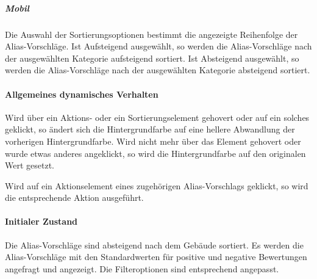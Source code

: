 \subparagraph*{Mobil}
Die Auswahl der Sortierungsoptionen bestimmt die angezeigte Reihenfolge der Alias-Vorschläge.
Ist \dq Aufsteigend \dq{} ausgewählt, so werden die Alias-Vorschläge nach der ausgewählten Kategorie aufsteigend sortiert.
Ist \dq Absteigend \dq{} ausgewählt, so werden die Alias-Vorschläge nach der ausgewählten Kategorie absteigend sortiert.

\paragraph*{Allgemeines dynamisches Verhalten}
Wird über ein Aktions- oder ein Sortierungselement gehovert oder auf ein solches geklickt, so ändert sich die Hintergrundfarbe auf eine hellere Abwandlung der vorherigen Hintergrundfarbe.
Wird nicht mehr über das Element gehovert oder wurde etwas anderes angeklickt, so wird die Hintergrundfarbe auf den originalen Wert gesetzt.

Wird auf ein Aktionselement eines zugehörigen Alias-Vorschlags geklickt, so wird die entsprechende Aktion ausgeführt.

\paragraph*{Initialer Zustand}
Die Alias-Vorschläge sind absteigend nach dem Gebäude sortiert.
Es werden die Alias-Vorschläge mit den Standardwerten für positive und negative Bewertungen angefragt und angezeigt.
Die Filteroptionen sind entsprechend angepasst.